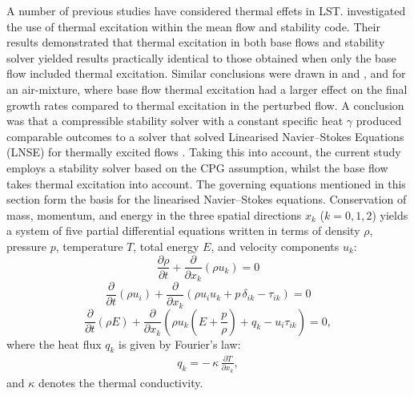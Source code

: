 A number of previous studies have considered thermal effets in \gls{LST}. \cite{Wartemann2019} investigated the use of thermal excitation within the mean flow and stability code. Their results demonstrated that thermal excitation in both base flows and stability solver yielded results practically identical to those obtained when only the base flow included thermal excitation. Similar conclusions were drawn in \cite{MortensenZhong2013} and \cite{miromiroThesis}, and \cite{BitterShepherd2015} for an air-mixture, where base flow thermal excitation had a larger effect on the final growth rates compared to thermal excitation in the perturbed flow. A conclusion was that a compressible stability solver with a constant specific heat $\gamma$ produced comparable outcomes to a solver that solved Linearised Navier--Stokes Equations (LNSE) for thermally excited flows \citep{Wartemann2019}. Taking this into account, the current study employs a stability solver based on the \gls{CPG} assumption, whilst the base flow takes thermal excitation into account. The governing equations mentioned in this section form the basis for the linearised Navier--Stokes equations. Conservation of mass, momentum, and energy in the three spatial directions $x_k$ ($k = 0, 1, 2$) yields a system of five partial differential equations written in terms of density $\rho$, pressure $p$, temperature $T$, total energy $E$, and velocity components $u_k$:
\begin{equation}
    \frac{\partial \rho}{\partial t} + \frac{\partial}{\partial x_k}\!\left(\rho u_k\right) = 0
\end{equation} \begin{equation}
    \frac{\partial}{\partial t}\!\left(\rho u_i\right)
+ \frac{\partial}{\partial x_k}\!\left(\rho u_i u_k + p\,\delta_{ik} - \tau_{ik}\right) = 0
\end{equation} \begin{equation}
    \frac{\partial}{\partial t}\!\left(\rho E\right)
+ \frac{\partial}{\partial x_k}\!\left(
  \rho u_k\!\left(E + \frac{p}{\rho}\right) + q_k - u_i \tau_{ik}
\right) = 0,
\end{equation}
where the heat flux $q_k$ is given by Fourier's law:
\begin{align}
q_k = -\,\kappa\,\frac{\partial T}{\partial x_k},
\end{align}
and $\kappa$ denotes the thermal conductivity.

